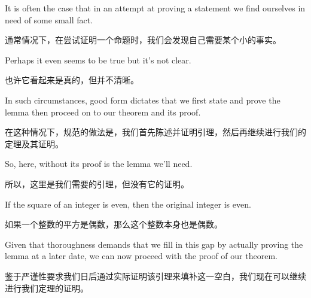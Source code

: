 It is often the case that in an 
attempt at proving a statement we find ourselves in need of some small 
fact.

通常情况下，在尝试证明一个命题时，我们会发现自己需要某个小的事实。

Perhaps it even seems to be true but it's not clear.

也许它看起来是真的，但并不清晰。

In such 
circumstances, good form dictates that we first state and prove the 
lemma then proceed on to our theorem and its proof.

在这种情况下，规范的做法是，我们首先陈述并证明引理，然后再继续进行我们的定理及其证明。

So, here, without 
its proof is the lemma we'll need.

所以，这里是我们需要的引理，但没有它的证明。

\begin{lem} If the square of an integer is even, then the original
integer is even.
\end{lem}

\begin{lem}
如果一个整数的平方是偶数，那么这个整数本身也是偶数。
\end{lem}

Given that thoroughness demands that we fill in this gap by actually
proving the lemma at a later date, we can now proceed with the proof
of our theorem.

鉴于严谨性要求我们日后通过实际证明该引理来填补这一空白，我们现在可以继续进行我们定理的证明。

